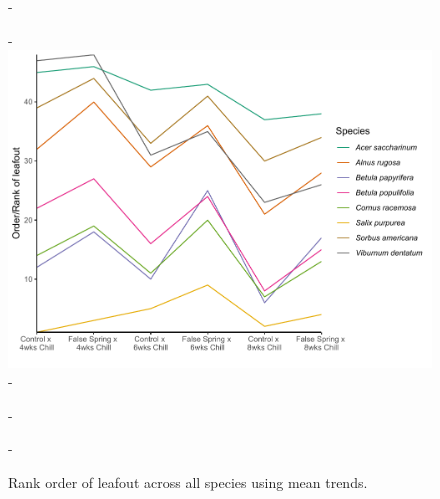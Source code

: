 \documentclass{article}\usepackage[]{graphicx}\usepackage[]{color}
\begin{document}
  {\begin{figure} [H]
  -\begin{center}
  -\includegraphics[width=12cm]{..//analyses/figures/leafoutorder_byrank.pdf} 
  -\caption{Rank order of leafout across all species using mean trends. }\label{fig:rank}
  -\end{center}
  -\end{figure}}
  
\end{document}

